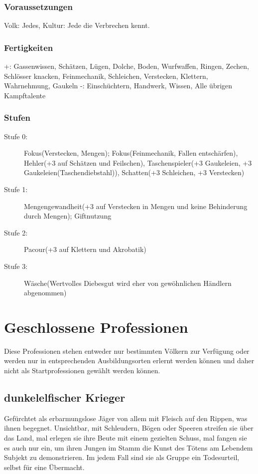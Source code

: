 \documentclass[a4paper,12pt,oneside]{book}
\begin{document}
\subsection{Voraussetzungen}
Volk: Jedes, Kultur: Jede die Verbrechen kennt.
\subsection{Fertigkeiten}
+: Gassenwissen, Schätzen, Lügen, Dolche, Boden, Wurfwaffen, Ringen, Zechen, Schlösser knacken, Feinmechanik, Schleichen, Verstecken, Klettern, Wahrnehmung, Gaukeln
-: Einschüchtern, Handwerk, Wissen, Alle übrigen Kampftalente
\subsection{Stufen}
\begin{description}
\item[Stufe 0:] Fokus(Verstecken, Mengen); Fokus(Feinmechanik, Fallen entschärfen), Hehler(+3 auf Schätzen und Feilschen), Taschenspieler(+3 Gaukeleien, +3 Gaukeleien(Taschendiebstahl)), Schatten(+3 Schleichen, +3 Verstecken)
\item[Stufe 1:] Mengengewandheit(+3 auf Verstecken in Mengen und keine Behinderung durch Mengen); Giftnutzung
\item[Stufe 2:] Pacour(+3 auf Klettern und Akrobatik)
\item[Stufe 3:] Wäsche(Wertvolles Diebesgut wird eher von gewöhnlichen Händlern abgenommen)
\end{description}
%
\chapter{Geschlossene Professionen}
Diese Professionen stehen entweder nur bestimmten Völkern zur Verfügung oder werden nur in entsprechenden Ausbildungsorten erlernt werden können und daher nicht als Startprofessionen gewählt werden können.
\section{dunkelelfischer Krieger}
Gefürchtet als erbarmungslose Jäger von allem mit Fleisch auf den Rippen, was ihnen begegnet. Unsichtbar, mit Schleudern, Bögen oder Speeren streifen sie über das Land, mal erlegen sie ihre Beute mit einem gezielten Schuss, mal fangen sie es auch nur ein, um ihren Jungen im Stamm die Kunst des Tötens am Lebendem Subjekt zu demonstrieren. Im jedem Fall sind sie als Gruppe ein Todesurteil, selbst für eine Übermacht.
%
\end{document}
